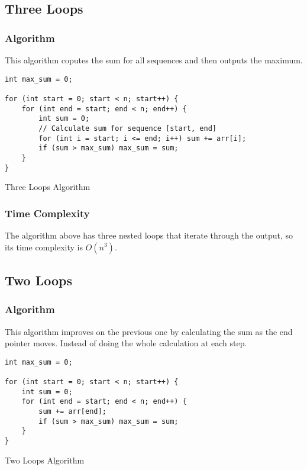 \documentclass[12pt, a4paper]{article}
\begin{document}
\subsection{Three Loops}

\subsubsection{Algorithm}

This algorithm coputes the sum for all sequences and then outputs the maximum.

\begin{listing}[!ht]
\begin{verbatim}
int max_sum = 0;

for (int start = 0; start < n; start++) {
    for (int end = start; end < n; end++) {
        int sum = 0;
        // Calculate sum for sequence [start, end]
        for (int i = start; i <= end; i++) sum += arr[i];
        if (sum > max_sum) max_sum = sum;
    }
}
\end{verbatim}
\caption{Three Loops Algorithm}
\label{listing:alg-three-loops}
\end{listing}

\subsubsection{Time Complexity}

The algorithm above has three nested loops that iterate through the output, so
its time complexity is $O(n^3)$.

\newpage

\subsection{Two Loops}

\subsubsection{Algorithm}

This algorithm improves on the previous one by calculating the sum as the end
pointer moves. Instead of doing the whole calculation at each step.

\begin{listing}[!ht]
\begin{verbatim}
int max_sum = 0;

for (int start = 0; start < n; start++) {
    int sum = 0;
    for (int end = start; end < n; end++) {
        sum += arr[end];
        if (sum > max_sum) max_sum = sum;
    }
}
\end{verbatim}
\caption{Two Loops Algorithm}
\label{listing:alg-two-loops}
\end{listing}
\end{document}
